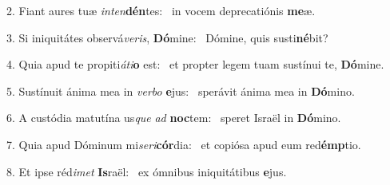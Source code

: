 2. Fiant aures tuæ \textit{in}\textit{ten}\textbf{dén}tes: \ast\  in vocem deprecatiónis \textbf{me}æ.\

3. Si iniquitátes observá\textit{ve}\textit{ris}, \textbf{Dó}mine: \ast\  Dómine, quis susti\textbf{né}bit?\

4. Quia apud te propiti\textit{á}\textit{ti}\textbf{o} est: \ast\  et propter legem tuam sustínui te, \textbf{Dó}mine.\

5. Sustínuit ánima mea in \textit{ver}\textit{bo} \textbf{e}jus: \ast\  sperávit ánima mea in \textbf{Dó}mino.\

6. A custódia matutína us\textit{que} \textit{ad} \textbf{noc}tem: \ast\  speret Israël in \textbf{Dó}mino.\

7. Quia apud Dóminum mi\textit{se}\textit{ri}\textbf{cór}dia: \ast\  et copiósa apud eum red\textbf{émp}tio.\

8. Et ipse réd\textit{i}\textit{met} \textbf{Is}raël: \ast\  ex ómnibus iniquitátibus \textbf{e}jus.\

